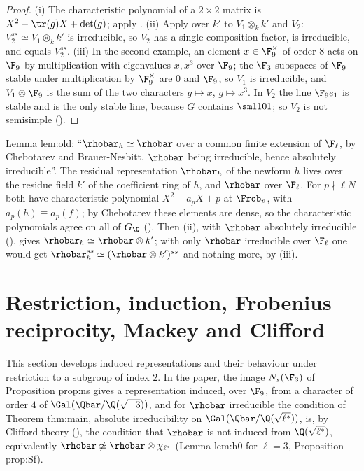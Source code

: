 \begin{proof}
(i) The characteristic polynomial of a $2\times2$ matrix is $X^2-\tr(g)X+\det(g)$; apply .
(ii) Apply  over $k'$ to $V_1\otimes_kk'$ and $V_2$: $V_2^{ss}\simeq V_1\otimes_kk'$ is irreducible, so $V_2$ has a single composition
factor, is irreducible, and equals $V_2^{ss}$.
(iii) In the second example, an element $x\in\F_9^\times$ of order $8$ acts on $\F_9$ by multiplication with eigenvalues $x,x^3$ over $\F_9$; the
$\F_3$-subspaces of $\F_9$ stable under multiplication by $\F_9^\times$ are $0$ and $\F_9$, so $V_1$ is irreducible, and $V_1\otimes\F_9$ is the sum of
the two characters $g\mapsto x$, $g\mapsto x^3$. In $V_2$ the line $\F_9e_1$ is stable and is the only stable line, because $G$ contains $\sm1101$;
so $V_2$ is not semisimple ().
\end{proof}

\begin{paperlink}
Lemma lem:old: ``$\rhobar_h\simeq\rhobar$ over a common finite extension of $\F_\ell$, by Chebotarev and Brauer-Nesbitt, $\rhobar$ being irreducible, hence
absolutely irreducible''. The residual representation $\rhobar_h$ of the newform $h$ lives over the residue field $k'$ of the coefficient
ring of $h$, and $\rhobar$ over $\F_\ell$. For $p\nmid\ell N$ both have characteristic polynomial $X^2-a_pX+p$ at $\Frob_p$, with
$a_p(h)\equiv a_p(f)$; by Chebotarev these elements are dense, so the characteristic polynomials agree on all of $G_\Q$ ().
Then (ii), with $\rhobar$ absolutely irreducible (), gives
$\rhobar_h\simeq\rhobar\otimes k'$; with only $\rhobar$ irreducible over $\F_\ell$ one would get $\rhobar_h^{ss}\simeq(\rhobar\otimes k')^{ss}$ and nothing more, by (iii).
\end{paperlink}

\section[Restriction, induction, Mackey and Clifford]{Restriction, induction, Frobenius reciprocity, Mackey and Clifford}\label{sec:reps:induction}

This section develops induced representations and their behaviour under restriction to a subgroup of index $2$. In the paper,
the image $N_s(\F_3)$ of Proposition prop:ns gives a representation induced, over $\F_9$, from a character of order $4$ of
$\Gal(\Qbar/\Q(\sqrt{-3}))$, and for $\rhobar$ irreducible the condition of Theorem thm:main, absolute irreducibility on $\Gal(\Qbar/\Q(\sqrt{\ell^*}))$,
is, by Clifford theory (), the condition that $\rhobar$ is not induced from $\Q(\sqrt{\ell^*})$, equivalently $\rhobar\not\simeq\rhobar\otimes\chi_{\ell^*}$
(Lemma lem:h0 for $\ell=3$, Proposition prop:Sf).

